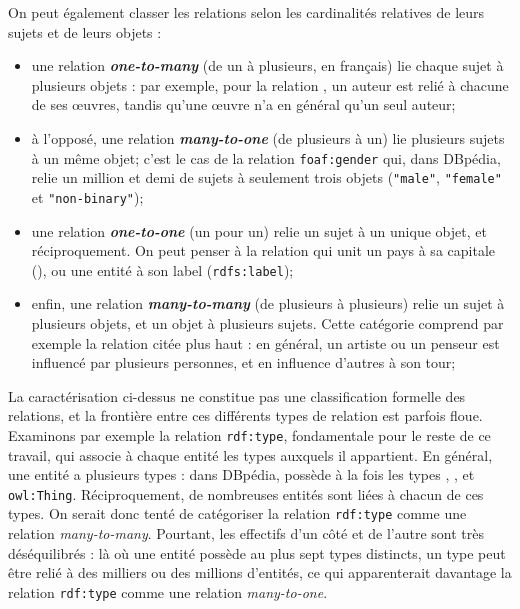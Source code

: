 On peut également classer les relations selon les cardinalités relatives de leurs sujets et de leurs objets :
\begin{itemize}
    \item une relation \textbf{\textit{one-to-many}} (de un à plusieurs, en français) lie chaque sujet à plusieurs objets : par exemple, pour la relation , un auteur est relié à chacune de ses œuvres, tandis qu'une œuvre n'a en général qu'un seul auteur;
    \item à l'opposé, une relation \textbf{\textit{many-to-one}} (de plusieurs à un) lie plusieurs sujets à un même objet; c'est le cas de la relation \texttt{foaf:gender} qui, dans DBpédia, relie un million et demi de sujets à seulement trois objets (\texttt{"male"}, \texttt{"female"} et \texttt{"non-binary"});
    \item une relation \textbf{\textit{one-to-one}} (un pour un) relie un sujet à un unique objet, et réciproquement. On peut penser à la relation qui unit un pays à sa capitale (), ou une entité à son label (\texttt{rdfs:label});
    \item enfin, une relation \textbf{\textit{many-to-many}} (de plusieurs à plusieurs) relie un sujet à plusieurs objets, et un objet à plusieurs sujets. Cette catégorie comprend par exemple la relation  citée plus haut : en général, un artiste ou un penseur est influencé par plusieurs personnes, et en influence d'autres à son tour;
\end{itemize}
La caractérisation ci-dessus ne constitue pas une classification formelle des relations, et la frontière entre ces différents types de relation est parfois floue. Examinons par exemple la relation \texttt{rdf:type}, fondamentale pour le reste de ce travail, qui associe à chaque entité les types auxquels il appartient. En général, une entité a plusieurs types : dans DBpédia,  possède à la fois les types , ,  et \texttt{owl:Thing}. Réciproquement, de nombreuses entités sont liées à chacun de ces types. On serait donc tenté de catégoriser la relation \texttt{rdf:type} comme une relation \textit{many-to-many}. Pourtant, les effectifs d'un côté et de l'autre sont très déséquilibrés : là où une entité possède au plus sept types distincts, un type peut être relié à des milliers ou des millions d'entités, ce qui apparenterait davantage la relation \texttt{rdf:type} comme une relation \textit{many-to-one}. %

